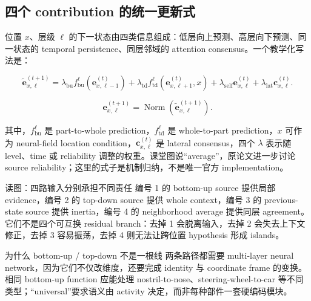 
\subsection{四个 contribution 的统一更新式}

位置 $x$、层级 $\ell$ 的下一状态由四类信息组成：低层向上预测、高层向下预测、同一状态的 temporal persistence、同层邻域的 attention consensus。一个教学化写法是：

\[
\tilde{\mathbf e}_{x,\ell}^{(t+1)}=
\lambda_{\mathrm{bu}} f_{\mathrm{bu}}^{\ell}\!\left(\mathbf e_{x,\ell-1}^{(t)}\right)
+\lambda_{\mathrm{td}} f_{\mathrm{td}}^{\ell}\!\left(\mathbf e_{x,\ell+1}^{(t)},x\right)
+\lambda_{\mathrm{self}}\mathbf e_{x,\ell}^{(t)}
+\lambda_{\mathrm{lat}}\mathbf c_{x,\ell}^{(t)}.
\]

\[
\mathbf e_{x,\ell}^{(t+1)}=\operatorname{Norm}\!\left(\tilde{\mathbf e}_{x,\ell}^{(t+1)}\right).
\]

其中，$f_{\mathrm{bu}}^{\ell}$ 是 part-to-whole prediction，$f_{\mathrm{td}}^{\ell}$ 是 whole-to-part prediction，$x$ 可作为 neural-field location condition，$\mathbf c_{x,\ell}^{(t)}$ 是 lateral consensus，四个 $\lambda$ 表示随 level、time 或 reliability 调整的权重。课堂图说“average”，原论文进一步讨论 source reliability；这里的式子是机制归纳，不是唯一官方 implementation。


\begin{knowledgebox}{读图：四路输入分别承担不同责任}
编号 1 的 bottom-up source 提供局部 evidence，编号 2 的 top-down source 提供 whole context，编号 3 的 previous-state source 提供 inertia，编号 4 的 neighborhood average 提供同层 agreement。它们不是四个可互换 residual branch：去掉 1 会脱离输入，去掉 2 会失去上下文修正，去掉 3 容易振荡，去掉 4 则无法让跨位置 hypothesis 形成 islands。
\end{knowledgebox}

\begin{importantbox}{为什么 bottom-up / top-down 不是一根线}
两条路径都需要 multi-layer neural network，因为它们不仅改维度，还要完成 identity 与 coordinate frame 的变换。相同 bottom-up function 应能处理 nostril-to-nose、steering-wheel-to-car 等不同类型；“universal”要求语义由 activity 决定，而非每种部件一套硬编码模块。
\end{importantbox}

